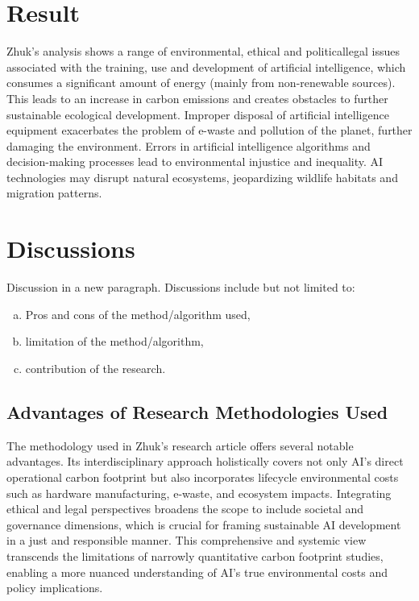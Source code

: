 \documentclass[a4paper, 12pt]{article}
\begin{document}
\section{Result}
\hspace{24pt} Zhuk's analysis shows a range of environmental, ethical and politicallegal issues associated with the training, use and development of artificial intelligence, which consumes a significant amount of energy (mainly from non-renewable sources). This leads to an increase in carbon emissions and creates obstacles to further sustainable ecological development. Improper disposal of artificial intelligence equipment exacerbates the problem of e-waste and pollution of the planet, further damaging the environment. Errors in artificial intelligence algorithms and decision-making processes
lead to environmental injustice and inequality. AI technologies may disrupt
natural ecosystems, jeopardizing wildlife habitats and migration patterns.

\section{Discussions}
Discussion in a new paragraph.
Discussions include but not limited to:
\begin{enumerate}[(a)]
\item Pros and cons of the method/algorithm used,
\item limitation of the method/algorithm,
\item contribution of the research.
\end{enumerate}
\subsection{Advantages of Research Methodologies Used}
\hspace{24pt} The methodology used in Zhuk's research article offers several notable advantages. Its interdisciplinary approach holistically covers not only AI's direct operational carbon footprint but also incorporates lifecycle environmental costs such as hardware manufacturing, e-waste, and ecosystem impacts. Integrating ethical and legal perspectives broadens the scope to include societal and governance dimensions, which is crucial for framing sustainable AI development in a just and responsible manner. This comprehensive and systemic view transcends the limitations of narrowly quantitative carbon footprint studies, enabling a more nuanced understanding of AI's true environmental costs and policy implications.
\end{document}

